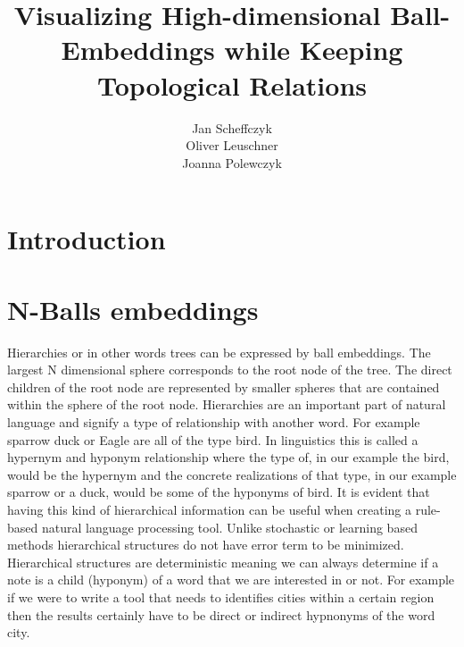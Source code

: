 \documentclass[]{article}
\title{Visualizing High-dimensional Ball-Embeddings
	while Keeping Topological Relations}
\author{Jan Scheffczyk \\ Oliver Leuschner \\ Joanna Polewczyk}
\begin{document}
\maketitle

%
%
%
\newpage
\section{Introduction}



\section{N-Balls embeddings}
\label{sec::ball}
Hierarchies or in other words trees can be expressed by ball embeddings. The largest N dimensional sphere corresponds to the root node of the tree. The direct children of the root node are represented by smaller spheres that are contained within the sphere of the root node. Hierarchies are an important part of natural language and signify a type of relationship with another word. For example sparrow duck or Eagle are all of the type bird. In linguistics this is called a hypernym and hyponym relationship where the type of, in our example the bird, would be the hypernym and the concrete realizations of that type, in our example sparrow or a duck, would be some of the hyponyms of bird. It is evident that having this kind of hierarchical information can be useful when creating a rule-based natural language processing tool. Unlike stochastic or learning based methods hierarchical structures do not have error term to be minimized. Hierarchical structures are deterministic meaning we can always determine if a note is a child (hyponym) of a word that we are interested in or not. For example if we were to write a tool that needs to identifies cities within a certain region then the results certainly have to be direct or indirect hypnonyms of the word city.
\par
\end{document}
